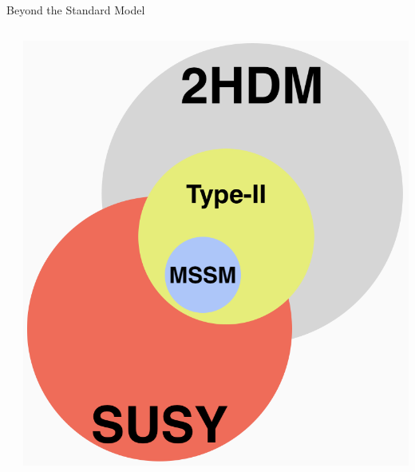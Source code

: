 \documentclass[aspectratio=169,xcolor=table]{beamer}
\def\boxit#1{%
  \smash{\color{red}\fboxrule=1pt\relax\fboxsep=2pt\relax%
  \llap{\rlap{\fbox{\vphantom{0}\makebox[#1]{}}}~}}\ignorespaces
}
\begin{document}
\begin{frame}[t]{Beyond the Standard Model}
\begin{columns}[t]
\begin{itemize}
\begin{itemize}
\begin{itemize}
              \end{itemize}
          \end{itemize}
        \end{itemize}
      \begin{centering}
      \includegraphics[height=.4\textheight,keepaspectratio=true]{SUSY_Bubble.png}
      \end{centering}
      \centering
        \begin{table}[!thp]
          \centering
      \end{table}
      \end{columns}
    \end{frame}
\end{document}
